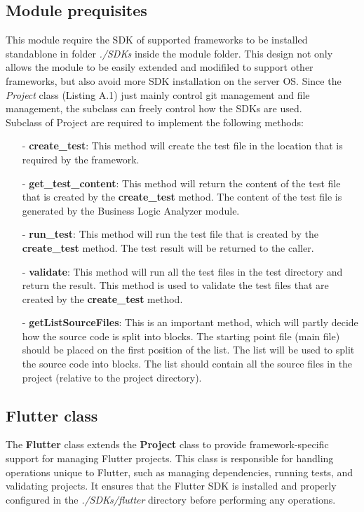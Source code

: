 \subsection{Module prequisites}
This module require the SDK of supported frameworks to be installed standablone in folder \textit{./SDKs} inside the module folder. This design not only allows the module to be easily extended and modifiled to support other frameworks, but also avoid more SDK installation on the server OS. Since the \textit{Project} class (Listing A.1) just mainly control git management and file management, the subclass can freely control how the SDKs are used. \\

Subclass of Project are required to implement the following methods:
    \begin{itemize}
        \item[-] \textbf{create\_test}: This method will create the test file in the location that is required by the framework.
        \item[-] \textbf{get\_test\_content}: This method will return the content of the test file that is created by the \textbf{create\_test} method. The content of the test file is generated by the Business Logic Analyzer module.
        \item[-] \textbf{run\_test}: This method will run the test file that is created by the \textbf{create\_test} method. The test result will be returned to the caller.
        \item[-] \textbf{validate}: This method will run all the test files in the test directory and return the result. This method is used to validate the test files that are created by the \textbf{create\_test} method.
        \item[-] \textbf{getListSourceFiles}: This is an important method, which will partly decide how the source code is split into blocks. The starting point file (main file) should be placed on the first position of the list. The list will be used to split the source code into blocks. The list should contain all the source files in the project (relative to the project directory).
    \end{itemize}


\subsection{Flutter class}

The \textbf{Flutter} class extends the \textbf{Project} class to provide framework-specific support for managing Flutter projects. This class is responsible for handling operations unique to Flutter, such as managing dependencies, running tests, and validating projects. It ensures that the Flutter SDK is installed and properly configured in the \textit{./SDKs/flutter} directory before performing any operations.

